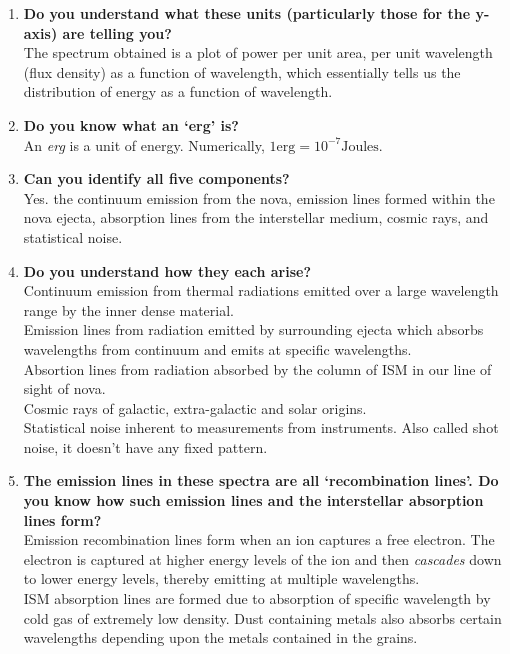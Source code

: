 \documentclass{article}
\begin{document}
	\begin{enumerate}

		\item \textbf{Do you understand what these units (particularly those for the y-axis) are telling you?} \\
		The spectrum obtained is a plot of power per unit area, per unit wavelength (flux density) as a function of wavelength, which essentially tells us the distribution of energy as a function of wavelength.

		\item \textbf{Do you know what an ‘erg’ is?} \\
		An \emph{erg} is a unit of energy. Numerically, \(1 \textrm{erg} = 10^{-7} \textrm{Joules}\).

		\item \textbf{Can you identify all five components?} \\
		Yes. the continuum emission from the nova, emission lines formed within the nova ejecta, absorption lines from the interstellar medium, cosmic rays, and statistical noise. 

		\item \textbf{Do you understand how they each arise?} \\
		Continuum emission from thermal radiations emitted over a large wavelength range by the inner dense material. \\
		Emission lines from radiation emitted by surrounding ejecta which absorbs wavelengths from continuum and emits at specific wavelengths. \\
		Absortion lines from radiation absorbed by the column of ISM in our line of sight of nova. \\
		Cosmic rays of galactic, extra-galactic and solar origins. \\
		Statistical noise inherent to measurements from instruments. Also called shot noise, it doesn't have any fixed pattern.

		\item \textbf{The emission lines in these spectra are all ‘recombination lines’. Do you know how such emission lines and the interstellar absorption lines form?} \\
		Emission recombination lines form when an ion captures a free electron. The electron is captured at higher energy levels of the ion and then \emph{cascades} down to lower energy levels, thereby emitting at multiple wavelengths. \\
		ISM absorption lines are formed due to absorption of specific wavelength by cold gas of extremely low density. Dust containing metals also absorbs certain wavelengths depending upon the metals contained in the grains.


\end{enumerate}
\end{document}
